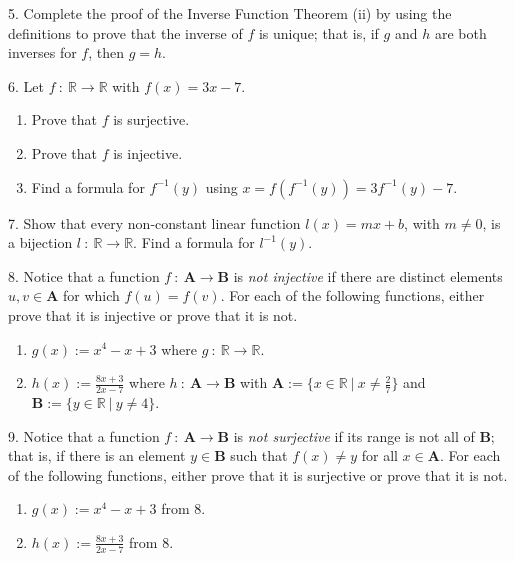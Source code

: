 \documentclass{article}
\newcommand\A{\mathbf A}
\newcommand\B{\mathbf B}
\newcommand{\0}{\mathbf 0}
\newcommand{\1}{\mathbf 1}
\newcommand\R{\mathbb R}
\begin{document}
\begin{description}
  \item{5.} Complete the proof of the Inverse Function Theorem (ii) by using the definitions to prove that the inverse of $f$ is unique; that is, if $g$ and $h$ are both inverses for $f$, then $g = h$.

  \item{6.} Let $f\ :\ \R \to \R$ with $f(x) = 3x - 7$.
    \begin{enumerate}[\hspace{1cm}(i)]
      \item Prove that $f$ is surjective.
      \item Prove that $f$ is injective.
      \item Find a formula for $f^{-1}(y)$ using $x = f(f^{-1}(y)) = 3f^{-1}(y) - 7$.
    \end{enumerate}

  \item{7.} Show that every non-constant linear function $l(x) = mx+b$, with $m \neq 0$, is a bijection $l\ :\ \R \to \R$. Find a formula for $l^{-1}(y)$.

  \item{8.} Notice that a function $f\ :\ \A \to \B$ is \emph{not injective} if there are distinct elements $u,v \in \A$ for which $f(u) = f(v)$. For each of the following functions, either prove that it is injective or prove that it is not.
    \begin{enumerate}[\hspace{1cm}(i)]
      \item $g(x) := x^4 - x +3$ where $g\ :\ \R \to \R$.
      \item $h(x) := \frac{8x+3}{2x-7}$ where $h\ :\ \A \to \B$ with $\A := \{ x \in \R\ |\ x \neq \frac{2}{7} \}$ and $\B := \{ y \in \R\ |\ y \neq 4 \}$.
    \end{enumerate}

  \item{9.} Notice that a function $f\ :\ \A \to \B$ is \emph{not surjective} if its range is not all of $\B$; that is, if there is an element $y \in \B$ such that $f(x) \neq y$ for all $x \in \A$. For each of the following functions, either prove that it is surjective or prove that it is not.
    \begin{enumerate}[\hspace{1cm}(i)]
      \item $g(x) := x^4 - x +3$ from 8.
      \item $h(x) := \frac{8x+3}{2x-7}$ from 8.
    \end{enumerate}


\end{description}
\end{document}
